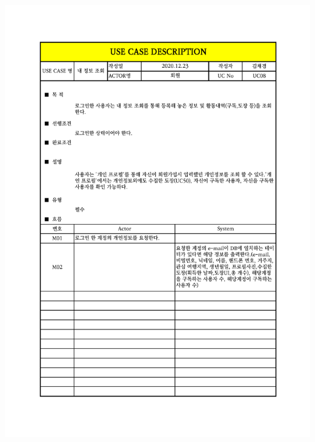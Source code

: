 {{{{{{{{{\includegraphics[width=1.1\textwidth]{./Figure/Design/Display/usecase/008.pdf} \\
}}}}}}}}}

